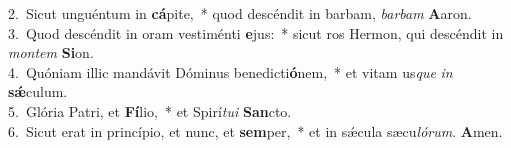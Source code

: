 {2.~}Sicut unguéntum in \textbf{cá}pite,~* quod descéndit in barbam, \textit{bar}\textit{bam} \textbf{A}aron.\\
{3.~}Quod descéndit in oram vestiménti \textbf{e}jus:~* sicut ros Hermon, qui descéndit in \textit{mon}\textit{tem} \textbf{Si}on.\\
{4.~}Quóniam illic mandávit Dóminus benedicti\textbf{ó}nem,~* et vitam us\textit{que} \textit{in} \textbf{sǽ}culum.\\
{5.~}Glória Patri, et \textbf{Fí}lio,~* et Spirí\textit{tu}\textit{i} \textbf{San}cto.\\
{6.~}Sicut erat in princípio, et nunc, et \textbf{sem}per,~* et in sǽcula sæcu\textit{ló}\textit{rum}. \textbf{A}men.\\
